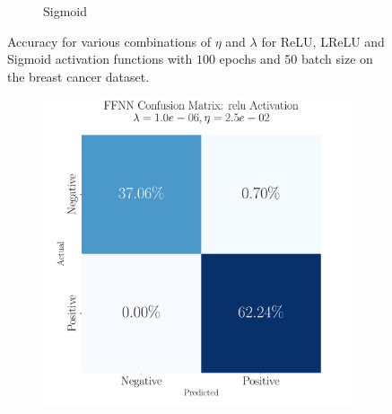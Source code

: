 \documentclass[%
reprint,s
amsmath,amssymb,
aps,
]{revtex4-2}
\begin{document}
\begin{figure}[ht!]
\begin{subfigure}{0.41\textwidth}
		\caption{Sigmoid}
		\label{fig:Sigmoid_heatmap}
	\end{subfigure}
	\caption{Accuracy for various combinations of $\eta$ and $\lambda$ for ReLU, LReLU and Sigmoid activation functions with $100$ epochs and $50$ batch size on the breast cancer dataset.}
	\label{fig:FFNN_cancer_heatmaps}
\end{figure}

\begin{figure}[b]
	\begin{subfigure}{0.325\textwidth}
		\includegraphics[width=\textwidth]{Figures/ConfusionMatrixFFNN_relu_Epochs100_randomstate42.pdf}
	\end{subfigure}
	\hfill
	\begin{subfigure}{0.325\textwidth}

\end{subfigure}
\end{figure}
\end{document}

